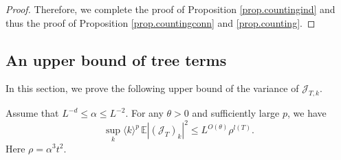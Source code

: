 \begin{proof}
Therefore, we complete the proof of Proposition \ref{prop.countingind} and thus the proof of Proposition \ref{prop.countingconn} and \ref{prop.counting}.

\end{proof}







\subsection{An upper bound of tree terms}\label{sec.treetermsupperbound}
In this section, we prove the following upper bound of the variance of $\mathcal{J}_{T,k}$.

\begin{prop}\label{prop.treetermsvariance}
Assume that $L^{-d}\le \alpha\le L^{-2}$. For any $\theta>0$ and sufficiently large $p$, we have
\begin{equation}
    \sup_k\langle k\rangle^p\, \mathbb{E}|(\mathcal{J}_T)_k|^2\le L^{O(\theta)} \rho^{l(T)}.
\end{equation}
Here $\rho=\alpha^3t^2$.
\end{prop}
